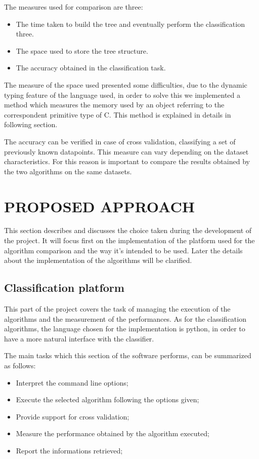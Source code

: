 \documentclass{acm_proc_article-sp-sigmod07}
\begin{document}
The measures used for comparison are three: 
\begin{itemize}
\item The time taken to build the tree and eventually perform the
classification three.
\item The space used to store the tree structure.
\item The accuracy obtained in the classification task.
\end{itemize}

The measure of the space used presented some difficulties, due to the
dynamic typing feature of the language used, in order to solve this we
implemented a method which measures the memory used by an object referring
to the correspondent primitive type of C. This method is explained in
details in following section.

The accuracy can be verified in case of cross validation, classifying a
set of previously known datapoints. This measure can vary depending on the
dataset characteristics. For this reason is important to compare the
results obtained by the two algorithms on the same datasets.

\section{PROPOSED APPROACH}
This section describes and discusses the choice taken during the
development of the project. It will focus first on the implementation of
the platform used for the algorithm comparison and the way it's intended
to be used.
Later the details about the implementation of the algorithms will be
clarified.

\subsection{Classification platform}
This part of the project covers the task of managing the execution of the
algorithms and the measurement of the performances. As for the
classification algorithms, the language chosen for the implementation is
python, in order to have a more natural interface with the classifier.

The main tasks which this section of the software performs, can be
summarized as follows:
\begin{itemize}
\item Interpret the command line options;
\item Execute the selected algorithm following the options given;
\item Provide support for cross validation;
\item Measure the performance obtained by the algorithm executed;
\item Report the informations retrieved;
\end{itemize}
\end{document}
